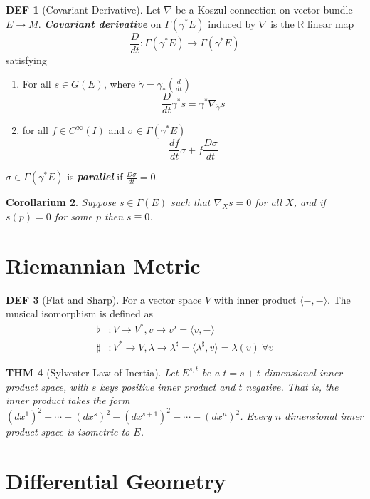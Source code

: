 \documentclass[twocolumn]{article}
\renewcommand{\emph}[1]{\textbf{\textit{#1}}}
\newcommand{\n}{\nabla}
\newcommand{\R}{\mathbb{R}}
\newcommand{\C}{C^{\infty}}
\newcommand{\G}{\Gamma}
\newcommand{\g}{\gamma}
\newtheorem{thm}{THM}
\newtheorem{corollary}[thm]{Corollarium}
\theoremstyle{definition}
\newtheorem{defi}[thm]{DEF}
\begin{document}
\begin{defi}[Covariant Derivative]
	Let $\n$ be a Koszul connection on vector bundle $E \rightarrow M$. 
	\emph{Covariant derivative} on $\G(\g^{*} E)$ induced by $\n$ is the $\R$ linear map 
	$$
	\frac{D}{dt} : \G(\g^* E) \rightarrow \G(\g^* E)
	$$
	satisfying 
	\begin{enumerate}
		\item For all $s \in G(E)$, where $\dot{\g} = \gamma_* (\frac{d}{dt})$
			$$
			\frac{D}{dt} \g^*s = \g^* \n_{\dot{\g}} s
			$$
		\item for all $f \in \C(I)$ and $\sigma \in \G(\g^*E)$
			$$
			\frac{df}{dt} \sigma + f \frac{D \sigma}{dt}
			$$
	\end{enumerate}

	$\sigma \in \G(\g^*E)$ is \emph{parallel} if $\frac{D \sigma}{dt} = 0$.
\end{defi}

\begin{corollary}
	Suppose $s \in \G(E)$ such that $\n_X s = 0$ for all $X$, and if $s(p) = 0$ for some $p$ then $s \equiv 0$.
\end{corollary}

\section{Riemannian Metric}

\begin{defi}[Flat and Sharp]
	 For a vector space $V$ with inner product $\langle -, - \rangle$. 
	 The musical isomorphism is defined as
	 \begin{align*}
		 \flat &: V \rightarrow V^*, v \mapsto v^{\flat} = \langle v, - \rangle \\
		 \sharp &:  V^* \rightarrow V, \lambda \rightarrow  \lambda^{\sharp} = \langle \lambda^{\sharp}, v \rangle = \lambda(v) \ \forall v
	 \end{align*}
\end{defi}

\begin{thm}[Sylvester Law of Inertia]
	Let $E^{s,t}$ be a $t = s+t$ dimensional inner product space, with $s$ keys positive inner product and $t$ negative. That is, the inner product takes the form $(dx^1)^2 + \cdots + (dx^s)^2 - (dx^{s+1})^2 - \cdots - (dx^n)^2$.
	Every $n$ dimensional inner product space is isometric to $E$.
\end{thm}

\section{Differential Geometry}
\end{document}
